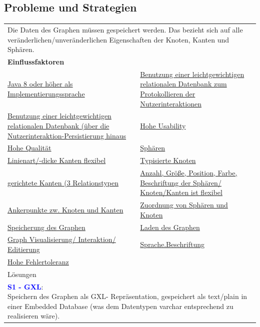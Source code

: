 \documentclass[enabledeprecatedfontcommands,fontsize=11pt,paper=a4,twoside]{scrartcl}
\newcounter{one}
\newcommand{\cb}[1]{{\textcolor{blue}{#1}}}
\begin{document}
\subsection{Probleme und Strategien}
\label{sec:strategien}

\begin{tabular} {|p{8cm} p{8cm}|}
	\hline
	\rowcolor{prob}\multicolumn{2}{|l|}{\parbox{16cm}{\textbf{01: Datensicherung/Persistenz des Graphen}}} \\  \hline\hline 
	\multicolumn{2}{|l|}{\parbox{16cm}{Die Daten des Graphen müssen gespeichert werden. Das bezieht sich auf alle veränderlichen/unveränderlichen Eigenschaften der Knoten, Kanten und Sphären.}}\rule{0pt}{4ex}\\ [2ex] \hline
	\multicolumn{2}{|l|}{\textbf{Einflussfaktoren}}\\
	\hyperlink{b}{Java 8 oder höher als Implementierungssprache}  & \hyperlink {d}{Benutzung einer leichtgewichtigen relationalen Datenbank zum Protokollieren der Nutzerinteraktionen}\\ 
	\hyperlink {e}{Benutzung einer leichtgewichtigen relationalen Datenbank (über die Nutzerinteraktion-Persistierung hinaus} & \hyperlink {g}{Hohe Usability}\\
	\hyperlink {h}{Hohe Qualität} &
	\hyperlink {n}{Sphären} \\
	\hyperlink {o}{Linienart/-dicke Kanten flexibel}&
	\hyperlink {p}{Typisierte Knoten} \\
	\hyperlink {q}{gerichtete Kanten (3 Relationstypen} &
	\hyperlink {r}{Anzahl, Größe, Position, Farbe, Beschriftung der Sphären/ Knoten/Kanten ist flexibel} \\
	\hyperlink {s}{Ankerpunkte zw. Knoten und Kanten} &
	\hyperlink {t}{Zuordnung von Sphären und Knoten} \\
	\hyperlink {v}{Speicherung des Graphen} &
	\hyperlink {w}{Laden des Graphen} \\
	\hyperlink {aa}{Graph Visualisierung/ Interaktion/ Editierung}&
	\hyperlink {hh}{Sprache.Beschriftung} \\
	\hyperlink {tt}{Hohe Fehlertoleranz} &
	\\ \hline
	\multicolumn{2}{|l|}{Lösungen} \\
	\multicolumn{2}{|l|}{\parbox{16cm}{
			\textbf{\cb{\hypertarget{yy}{S1 - GXL}}}: \\
			Speichern des Graphen als GXL- Repräsentation, gespeichert als text/plain in einer Embedded Database (was dem Datentypen varchar entsprechend zu realisieren wäre). \\
}}
\end{tabular}
\end{document}
